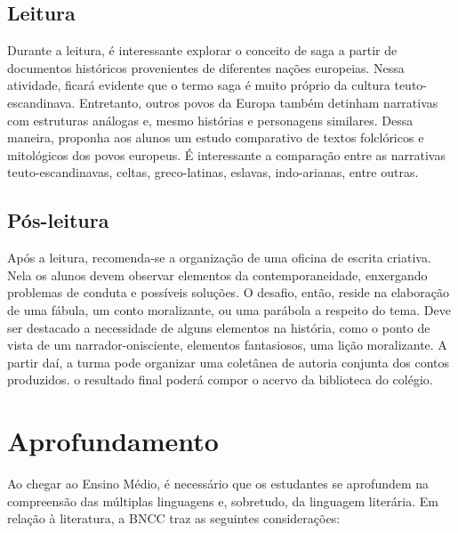 \documentclass[12pt]{extarticle}
\begin{document}


\subsection{Leitura}

Durante a leitura, é interessante explorar o conceito de saga a
partir de documentos históricos provenientes de diferentes nações
europeias. Nessa atividade, ficará evidente que o termo saga é muito
próprio da cultura teuto-escandinava. Entretanto, outros povos da Europa
também detinham narrativas com estruturas análogas e, mesmo histórias e
personagens similares. Dessa maneira, proponha aos alunos um estudo
comparativo de textos folclóricos e mitológicos dos povos europeus. É
interessante a comparação entre as narrativas teuto-escandinavas,
celtas, greco-latinas, eslavas, indo-arianas, entre outras.

\subsection{Pós-leitura}

Após a leitura, recomenda-se a organização de uma oficina de
escrita criativa. Nela os alunos devem observar elementos da
contemporaneidade, enxergando problemas de conduta e possíveis soluções.
O desafio, então, reside na elaboração de uma fábula, um conto
moralizante, ou uma parábola a respeito do tema. Deve ser destacado a
necessidade de alguns elementos na história, como o ponto de vista de um
narrador-onisciente, elementos fantasiosos, uma lição moralizante. A
partir daí, a turma pode organizar uma coletânea de autoria conjunta dos
contos produzidos. o resultado final poderá compor o acervo da
biblioteca do colégio.

\section{Aprofundamento}

Ao chegar ao Ensino Médio, é necessário que os estudantes se aprofundem
na compreensão das múltiplas linguagens e, sobretudo, da linguagem
literária. Em relação à literatura, a BNCC traz as seguintes
considerações:
\end{document}
